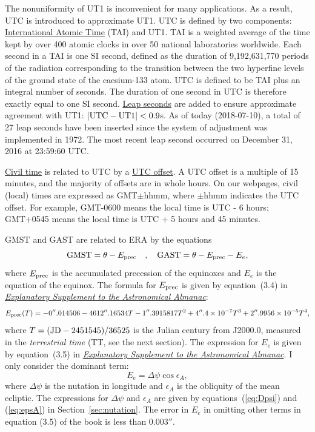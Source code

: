 \documentclass[12pt]{article}
\newcommand \beq {\begin{equation}}
\newcommand \eeq {\end{equation}}
\newcommand{\expl}{\href{http://www.uscibooks.com/urban.htm}{\it Explanatory Supplement to the Astronomical Almanac}}
\begin{document}
The nonuniformity of UT1 is inconvenient for many applications. As a result, 
UTC is introduced to approximate UT1. UTC is defined by two components: 
\href{https://en.wikipedia.org/wiki/International_Atomic_Time}{International 
Atomic Time} (TAI) and UT1. TAI is a weighted average of the time kept by 
over 400 atomic clocks in over 50 national laboratories worldwide. Each second 
in a TAI is one SI second, defined as the duration of 9,192,631,770 periods of 
the radiation corresponding to the transition between the two hyperfine 
levels of the ground state of the caesium-133 atom. UTC is defined to be 
TAI plus an integral number of seconds. The duration of one second in UTC 
is therefore exactly equal to one SI second. \href{https://en.wikipedia.org/wiki/Leap_second}
{Leap seconds} are added to ensure approximate agreement with UT1: $|{\rm UTC-UT1}|<0.9$s. 
As of today (2018-07-10), a total of 27 leap seconds have been inserted since the 
system of adjustment was implemented in 1972. The most recent leap second occurred 
on December 31, 2016 at 23:59:60 UTC.

\href{https://en.wikipedia.org/wiki/Civil_time}{\rm Civil time} is related to 
UTC by a \href{https://en.wikipedia.org/wiki/UTC_offset}{UTC offset}. A UTC 
offset is a multiple of 15 minutes, and the majority of offsets are in whole 
hours. On our webpages, civil (local) times are expressed as GMT$\pm$hhmm, where 
$\pm$hhmm indicates the UTC offset. For example, GMT-0600 means the local time 
is UTC - 6 hours; GMT+0545 means the local time is UTC + 5 hours and 45 minutes.

GMST and GAST are related to ERA by the equations 
\beq
  {\rm GMST} = \theta - E_{\rm prec} \ \ \ , \ \ \ {\rm GAST} = \theta - E_{\rm prec} - E_e ,
\label{eq:GST}
\eeq
where $E_{\rm prec}$ is the accumulated precession of the equinoxes and $E_e$ is 
the equation of the equinox. The formula for $E_{\rm prec}$ is given by 
equation~(3.4) in \expl:
\beq
  E_{\rm prec}(T) = -0''.014506 - 4612''.16534 T - 1''.3915817 T^2 
+ 4''.4\times 10^{-7} T^3 + 2''.9956\times 10^{-5} T^4 ,
\label{eq:Eprec}
\eeq
where $T= ({\rm JD} - 2451545)/36525$ is the Julian century from J2000.0, measured in 
the {\em terrestrial time} (TT, see the next section). The expression for 
$E_e$ is given by equation~(3.5) in \expl. I only consider the dominant term:
\beq
  E_e = \Delta \psi \cos \epsilon_A ,
\label{eq:Ee}
\eeq
where $\Delta \psi$ is the nutation in longitude and $\epsilon_A$ is the obliquity 
of the mean ecliptic. The expressions for $\Delta \psi$ and $\epsilon_A$ are given 
by equations~(\ref{eq:Dpsi}) and (\ref{eq:epsA}) in Section~\ref{sec:nutation}. 
The error in $E_e$ in omitting other terms in equation (3.5) of the book is 
less than $0.003''$.
\end{document}
